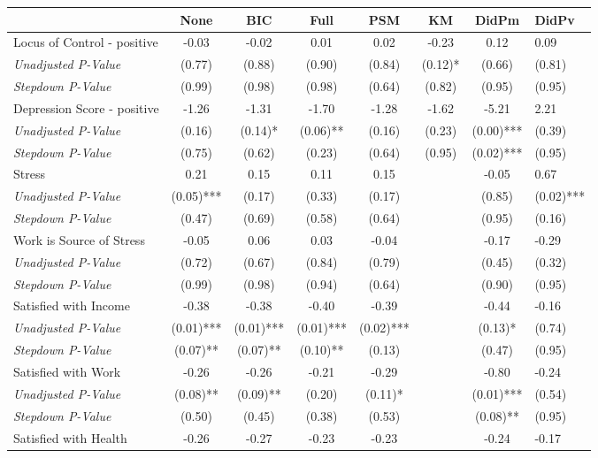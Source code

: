 \begin{tabular}{l c c c c c c}
\toprule
 & None & BIC & Full & PSM & KM & DidPm & DidPv \\
\midrule
Locus of Control - positive & -0.03 & -0.02 & 0.01 & 0.02 & -0.23 & 0.12 & 0.09 \\
\quad \textit{Unadjusted P-Value} & (0.77) & (0.88) & (0.90) & (0.84) & (0.12)* & (0.66) & (0.81) \\
\quad \textit{Stepdown P-Value} & (0.99) & (0.98) & (0.98) & (0.64) & (0.82) & (0.95) & (0.95) \\
Depression Score - positive & -1.26 & -1.31 & -1.70 & -1.28 & -1.62 & -5.21 & 2.21 \\
\quad \textit{Unadjusted P-Value} & (0.16) & (0.14)* & (0.06)** & (0.16) & (0.23) & (0.00)*** & (0.39) \\
\quad \textit{Stepdown P-Value} & (0.75) & (0.62) & (0.23) & (0.64) & (0.95) & (0.02)*** & (0.95) \\
Stress & 0.21 & 0.15 & 0.11 & 0.15 & & -0.05 & 0.67 \\
\quad \textit{Unadjusted P-Value} & (0.05)*** & (0.17) & (0.33) & (0.17) & & (0.85) & (0.02)*** \\
\quad \textit{Stepdown P-Value} & (0.47) & (0.69) & (0.58) & (0.64) & & (0.95) & (0.16) \\
Work is Source of Stress & -0.05 & 0.06 & 0.03 & -0.04 & & -0.17 & -0.29 \\
\quad \textit{Unadjusted P-Value} & (0.72) & (0.67) & (0.84) & (0.79) & & (0.45) & (0.32) \\
\quad \textit{Stepdown P-Value} & (0.99) & (0.98) & (0.94) & (0.64) & & (0.90) & (0.95) \\
Satisfied with Income & -0.38 & -0.38 & -0.40 & -0.39 & & -0.44 & -0.16 \\
\quad \textit{Unadjusted P-Value} & (0.01)*** & (0.01)*** & (0.01)*** & (0.02)*** & & (0.13)* & (0.74) \\
\quad \textit{Stepdown P-Value} & (0.07)** & (0.07)** & (0.10)** & (0.13) & & (0.47) & (0.95) \\
Satisfied with Work & -0.26 & -0.26 & -0.21 & -0.29 & & -0.80 & -0.24 \\
\quad \textit{Unadjusted P-Value} & (0.08)** & (0.09)** & (0.20) & (0.11)* & & (0.01)*** & (0.54) \\
\quad \textit{Stepdown P-Value} & (0.50) & (0.45) & (0.38) & (0.53) & & (0.08)** & (0.95) \\
Satisfied with Health & -0.26 & -0.27 & -0.23 & -0.23 & & -0.24 & -0.17 \\

\end{tabular}
